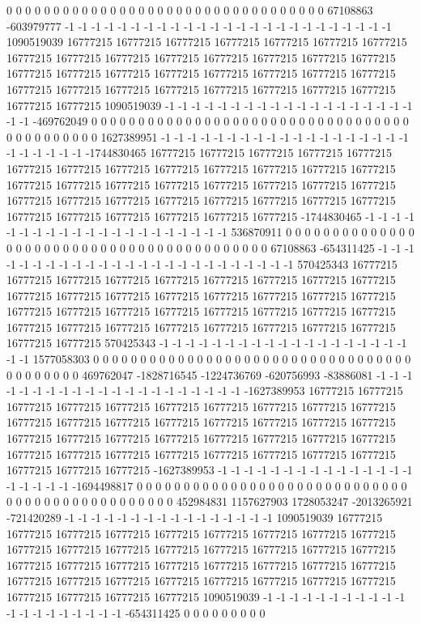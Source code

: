 0 0 0 0 0 0 0 0 0 0 0 0 0 0 0 0 0 0 0 0 0 0 0 0 0 0 0 0 0 0 0 0 0 0 67108863 -603979777 -1 -1 -1 -1 -1 -1 -1 -1 -1 -1 -1 -1 -1 -1 -1 -1 -1 -1 -1 -1 -1 -1 -1 -1 -1 1090519039 16777215 16777215 16777215 16777215 16777215 16777215 16777215 16777215 16777215 16777215 16777215 16777215 16777215 16777215 16777215 16777215 16777215 16777215 16777215 16777215 16777215 16777215 16777215 16777215 16777215 16777215 16777215 16777215 16777215 16777215 16777215 16777215 16777215 1090519039 -1 -1 -1 -1 -1 -1 -1 -1 -1 -1 -1 -1 -1 -1 -1 -1 -1 -1 -1 -1 -1 -469762049 0 0 0 0 0 0 0 0 0 0
0 0 0 0 0 0 0 0 0 0 0 0 0 0 0 0 0 0 0 0 0 0 0 0 0 0 0 0 0 0 0 0 0 0 1627389951 -1 -1 -1 -1 -1 -1 -1 -1 -1 -1 -1 -1 -1 -1 -1 -1 -1 -1 -1 -1 -1 -1 -1 -1 -1 -1744830465 16777215 16777215 16777215 16777215 16777215 16777215 16777215 16777215 16777215 16777215 16777215 16777215 16777215 16777215 16777215 16777215 16777215 16777215 16777215 16777215 16777215 16777215 16777215 16777215 16777215 16777215 16777215 16777215 16777215 16777215 16777215 16777215 16777215 16777215 16777215 -1744830465 -1 -1 -1 -1 -1 -1 -1 -1 -1 -1 -1 -1 -1 -1 -1 -1 -1 -1 -1 -1 -1 536870911 0 0 0 0 0 0 0 0 0
0 0 0 0 0 0 0 0 0 0 0 0 0 0 0 0 0 0 0 0 0 0 0 0 0 0 0 0 0 0 0 0 0 67108863 -654311425 -1 -1 -1 -1 -1 -1 -1 -1 -1 -1 -1 -1 -1 -1 -1 -1 -1 -1 -1 -1 -1 -1 -1 -1 -1 570425343 16777215 16777215 16777215 16777215 16777215 16777215 16777215 16777215 16777215 16777215 16777215 16777215 16777215 16777215 16777215 16777215 16777215 16777215 16777215 16777215 16777215 16777215 16777215 16777215 16777215 16777215 16777215 16777215 16777215 16777215 16777215 16777215 16777215 16777215 16777215 570425343 -1 -1 -1 -1 -1 -1 -1 -1 -1 -1 -1 -1 -1 -1 -1 -1 -1 -1 -1 -1 -1 1577058303 0 0 0 0 0 0 0 0 0
0 0 0 0 0 0 0 0 0 0 0 0 0 0 0 0 0 0 0 0 0 0 0 0 0 0 0 0 0 0 0 0 0 469762047 -1828716545 -1224736769 -620756993 -83886081 -1 -1 -1 -1 -1 -1 -1 -1 -1 -1 -1 -1 -1 -1 -1 -1 -1 -1 -1 -1 -1 -1627389953 16777215 16777215 16777215 16777215 16777215 16777215 16777215 16777215 16777215 16777215 16777215 16777215 16777215 16777215 16777215 16777215 16777215 16777215 16777215 16777215 16777215 16777215 16777215 16777215 16777215 16777215 16777215 16777215 16777215 16777215 16777215 16777215 16777215 16777215 16777215 16777215 16777215 -1627389953 -1 -1 -1 -1 -1 -1 -1 -1 -1 -1 -1 -1 -1 -1 -1 -1 -1 -1 -1 -1 -1694498817 0 0 0 0 0 0 0 0 0
0 0 0 0 0 0 0 0 0 0 0 0 0 0 0 0 0 0 0 0 0 0 0 0 0 0 0 0 0 0 0 0 0 0 0 0 0 0 452984831 1157627903 1728053247 -2013265921 -721420289 -1 -1 -1 -1 -1 -1 -1 -1 -1 -1 -1 -1 -1 -1 -1 -1 1090519039 16777215 16777215 16777215 16777215 16777215 16777215 16777215 16777215 16777215 16777215 16777215 16777215 16777215 16777215 16777215 16777215 16777215 16777215 16777215 16777215 16777215 16777215 16777215 16777215 16777215 16777215 16777215 16777215 16777215 16777215 16777215 16777215 16777215 16777215 16777215 16777215 16777215 1090519039 -1 -1 -1 -1 -1 -1 -1 -1 -1 -1 -1 -1 -1 -1 -1 -1 -1 -1 -1 -1 -654311425 0 0 0 0 0 0 0 0 0
